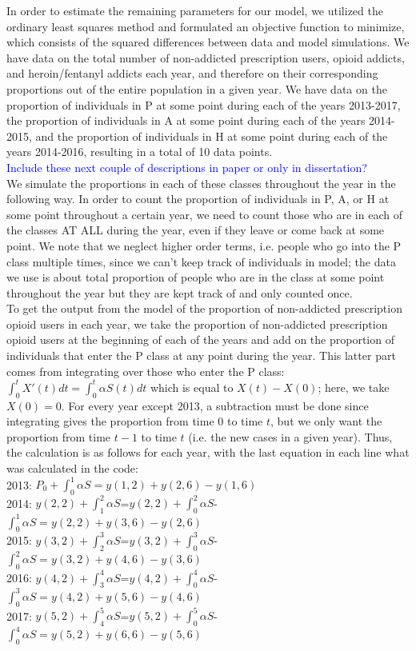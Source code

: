 \documentclass[12pt]{article}
\begin{document}
In order to estimate the remaining parameters for our model, we utilized the ordinary least squares method and formulated an objective function to minimize, which consists of the squared differences between data and model simulations. We have data on the total number of non-addicted prescription users, opioid addicts, and heroin/fentanyl addicts each year, and therefore on their corresponding proportions out of the entire population in a given year. We have data on the proportion of individuals in P at some point during each of the years 2013-2017, the proportion of individuals in A at some point during each of the years 2014-2015, and the proportion of individuals in H at some point during each of the years 2014-2016, resulting in a total of 10 data points. \\

\textcolor{blue}{Include these next couple of descriptions in paper or only in dissertation?} \\
We simulate the proportions in each of these classes throughout the year in the following way. 
In order to count the proportion of individuals in P, A, or H at some point throughout a certain year, 
 we need to count those who are in each of the classes AT ALL during the year, even if they leave or come back at some point. We note that we neglect higher order terms, i.e. people who go into the P class multiple times, since we can't keep track of individuals in model; the data we use is about total proportion of people who are in the class at some point throughout the year but they are kept track of and only counted once. \\
  
To get the output from the model of the proportion of non-addicted prescription opioid users in each year, we take the proportion of non-addicted prescription opioid users at the beginning of each of the years and add on the proportion of individuals that enter the P class at any point during the year. This latter part comes from integrating over those who enter the P class: $\int_0^t X'(t)dt=\int_0^t \alpha S(t)dt$ which is equal to $X(t)-X(0)$; here, we take $X(0)=0.$ For every year except 2013, a subtraction must be done since integrating gives the proportion from time $0$ to time $t$, but we only want the proportion from time $t-1$ to time $t$ (i.e. the new cases in a given year). Thus, the calculation is as follows for each year, with the last equation in each line what was calculated in the code: \\
2013: $P_0 + \int_0^1 \alpha S = y(1,2)+y(2,6)-y(1,6)$ \\
2014: $y(2,2)+\int_1^2 \alpha S$=$y(2,2)+\int_0^2 \alpha S$- $\int_0^1 \alpha S=y(2,2)+y(3,6)-y(2,6)$ \\
2015: $y(3,2)+\int_2^3 \alpha S$=$y(3,2)+\int_0^3 \alpha S$- $\int_0^2 \alpha S=y(3,2)+y(4,6)-y(3,6)$ \\
2016: $y(4,2)+\int_3^4 \alpha S$=$y(4,2)+\int_0^4 \alpha S$- $\int_0^3 \alpha S=y(4,2)+y(5,6)-y(4,6)$ \\
2017: $y(5,2)+\int_4^5 \alpha S$=$y(5,2)+\int_0^5\alpha S$- $\int_0^4 \alpha S=y(5,2)+y(6,6)-y(5,6)$ \\
\end{document}
